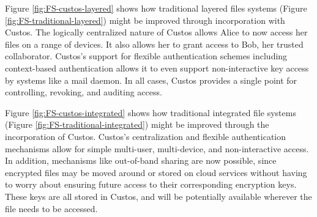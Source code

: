 Figure \ref{fig:FS-custos-layered} shows how traditional layered files
systems (Figure \ref{fig:FS-traditional-layered}) might be improved
through incorporation with Custos. The logically centralized nature of
Custos allows Alice to now access her files on a range of devices. It
also allows her to grant access to Bob, her trusted
collaborator. Custos's support for flexible authentication schemes
including context-based authentication allows it to even support
non-interactive key access by systems like a mail daemon. In all
cases, Custos provides a single point for controlling, revoking, and
auditing access.

Figure \ref{fig:FS-custos-integrated} shows how traditional integrated
file systems (Figure \ref{fig:FS-traditional-integrated}) might be
improved through the incorporation of Custos. Custos's centralization
and flexible authentication mechanisms allow for simple multi-user,
multi-device, and non-interactive access. In addition, mechanisms like
out-of-band sharing are now possible, since encrypted files may be
moved around or stored on cloud services without having to worry about
ensuring future access to their corresponding encryption keys. These
keys are all stored in Custos, and will be potentially available
wherever the file needs to be accessed.

